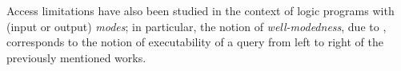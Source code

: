 
Access limitations have also been studied in the context of logic programs with
(input or output) \emph{modes}; in particular, the notion of
\emph{well-modedness}, due to \cite{DBLP:conf/slp/DembinskiM85}, corresponds to
the notion of executability of a query from left to right of the previously
mentioned works.
